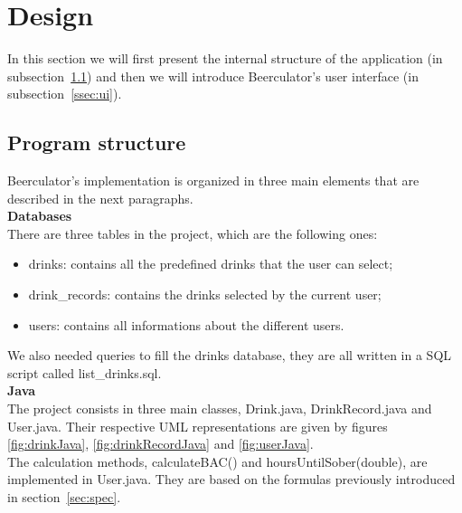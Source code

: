 \section{Design}
\label{sec:design}

In this section we will first present the internal structure of the application (in {\sc subsection}~\ref{ssec:struct}) and then we will introduce Beerculator's user interface (in {\sc subsection}~\ref{ssec:ui}).

\subsection{Program structure}
\label{ssec:struct}

Beerculator's implementation is organized in three main elements that are described in the next paragraphs.\\

{\bf Databases} \\ 
There are three tables in the project, which are the following ones:

\begin{itemize}[noitemsep]
\item drinks: contains all the predefined drinks that the user can select;
\item drink\_records: contains the drinks selected by the current user;
\item users: contains all informations about the different users.
\end{itemize}

We also needed queries to fill the \guillemotleft{} drinks \guillemotright{} database, they are all written in a SQL script called list\_drinks.sql.\\

{\bf Java} \\
The project consists in three main classes, Drink.java, DrinkRecord.java and User.java. Their respective UML representations are given by {\sc figures} \ref{fig:drinkJava}, \ref{fig:drinkRecordJava} and \ref{fig:userJava}.\\

The calculation methods, calculateBAC() and hoursUntilSober(double), are implemented in User.java. They are based on the formulas previously introduced in {\sc section}~\ref{sec:spec}. 

